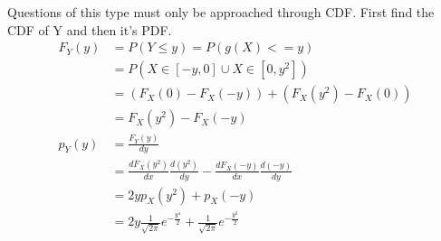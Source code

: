 \documentclass[../../probability-notes.tex]{subfile}
\begin{document}
        Questions of this type must only be approached through CDF. First find the CDF of Y and then it's PDF.
        \begin{align*}
            F_{Y}(y) &= P(Y \leq y) = P(g(X) <= y)\\
                    &= P(X \in [-y, 0] \cup X \in [0, y^{2}])\\
                    &= (F_{X}(0) - F_{X}(-y)) + (F_{X}(y^{2}) - F_{X}(0))\\
                    &= F_{X}(y^{2}) - F_{X}(-y)\\
            p_{Y}(y) &= \frac{F_{Y}(y)}{dy}\\
                    &= \frac{dF_{X}(y^{2})}{dx} \frac{d(y^{2})}{dy} - \frac{dF_{X}(-y)}{dx} \frac{d(-y)}{dy}\\
                    &= 2yp_{X}(y^{2}) + p_{X}(-y)\\
                    &= 2y\frac{1}{\sqrt{2\pi}}e^{-\frac{y^{4}}{2}} + \frac{1}{\sqrt{2\pi}} e^{-\frac{y^{2}}{2}}
        \end{align*}
\end{document}

